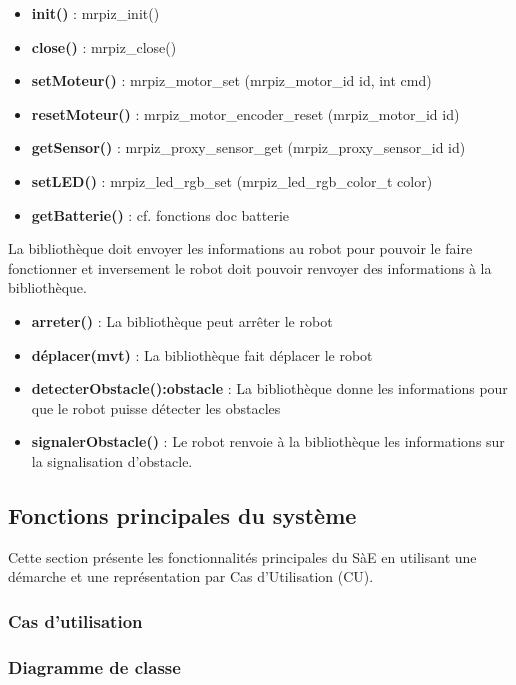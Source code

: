 \begin{itemize}
    \item \textbf{init()} : mrpiz\_init()
    \item \textbf{close()} : mrpiz\_close()
    \item \textbf{setMoteur()} : mrpiz\_motor\_set (mrpiz\_motor\_id id, int cmd)
    \item \textbf{resetMoteur()} : mrpiz\_motor\_encoder\_reset (mrpiz\_motor\_id id)
    \item \textbf{getSensor()} : mrpiz\_proxy\_sensor\_get (mrpiz\_proxy\_sensor\_id id)
    \item \textbf{setLED()} : mrpiz\_led\_rgb\_set (mrpiz\_led\_rgb\_color\_t color)
    \item \textbf{getBatterie()} : cf. fonctions doc batterie
\end{itemize}

La bibliothèque doit envoyer les informations au robot pour pouvoir le faire fonctionner et inversement le robot doit pouvoir renvoyer des informations à la bibliothèque.

\begin{itemize}
    \item \textbf{arreter()} : La bibliothèque peut arrêter le robot
    \item \textbf{déplacer(mvt)} : La bibliothèque fait déplacer le robot
    \item \textbf{detecterObstacle():obstacle} : La bibliothèque donne les informations pour que le robot puisse détecter les obstacles
    \item \textbf{signalerObstacle()} : Le robot renvoie à la bibliothèque les informations sur la signalisation d'obstacle.
\end{itemize}

\subsection{Fonctions principales du système}

Cette section présente les fonctionnalités principales du SàE en utilisant une démarche et une représentation par Cas d'Utilisation (CU).

\subsubsection{Cas d'utilisation}

\CU{}

\subsubsection{Diagramme de classe}

